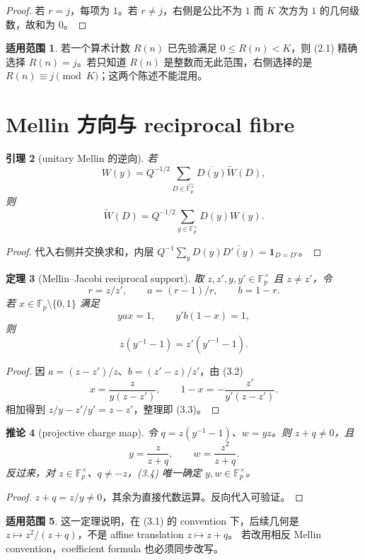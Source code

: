 \documentclass[11pt,a4paper]{ctexart}
\newtheorem{theorem}{定理}[section]
\newtheorem{lemma}[theorem]{引理}
\newtheorem{corollary}[theorem]{推论}
\theoremstyle{definition}
\newtheorem{remark}[theorem]{适用范围}
\newcommand{\F}{\mathbb F}
\newcommand{\G}{\F_p^\times}
\newcommand{\Gh}{\widehat{\G}}
\newcommand{\1}{\mathbf 1}
\begin{document}
\begin{proof}
若 $r=j$，每项为 $1$。若 $r\ne j$，右侧是公比不为 $1$ 而 $K$ 次方为
$1$ 的几何级数，故和为 $0$。
\end{proof}

\begin{remark}
若一个算术计数 $R(n)$ 已先验满足 $0\le R(n)<K$，则 (2.1) 精确选择
$R(n)=j$。若只知道 $R(n)$ 是整数而无此范围，右侧选择的是
$R(n)\equiv j\pmod K$；这两个陈述不能混用。
\end{remark}

\section{Mellin 方向与 reciprocal fibre}

\begin{lemma}[unitary Mellin 的逆向]
若
\[
W(y)=Q^{-1/2}\sum_{D\in\Gh}\overline{D(y)}\widetilde W(D),
\]
则
\[
\boxed{\widetilde W(D)=Q^{-1/2}\sum_{y\in\G}D(y)W(y).}
\tag{3.1}
\]
\end{lemma}

\begin{proof}
代入右侧并交换求和，内层
$Q^{-1}\sum_y D(y)\overline{D'(y)}=\1_{D=D'}$。
\end{proof}

\begin{theorem}[Mellin--Jacobi reciprocal support]
取 $z,z',y,y'\in\G$ 且 $z\ne z'$，令
\[
r=z/z',\qquad a=(r-1)/r,\qquad b=1-r.
\]
若 $x\in\F_p\setminus\{0,1\}$ 满足
\[
yax=1,\qquad y'b(1-x)=1,
\tag{3.2}
\]
则
\[
\boxed{z(y^{-1}-1)=z'(y'^{-1}-1).}
\tag{3.3}
\]
\end{theorem}

\begin{proof}
因 $a=(z-z')/z$、$b=(z'-z)/z'$，由 (3.2)
\[
x=\frac{z}{y(z-z')},\qquad
1-x=-\frac{z'}{y'(z-z')}.
\]
相加得到 $z/y-z'/y'=z-z'$，整理即 (3.3)。
\end{proof}

\begin{corollary}[projective charge map]
令 $q=z(y^{-1}-1)$、$w=yz$。则 $z+q\ne0$，且
\[
\boxed{y=\frac{z}{z+q},\qquad
w=\frac{z^2}{z+q}.}
\tag{3.4}
\]
反过来，对 $z\in\G$、$q\ne-z$，(3.4) 唯一确定 $y,w\in\G$。
\end{corollary}

\begin{proof}
$z+q=z/y\ne0$，其余为直接代数运算。反向代入可验证。
\end{proof}

\begin{remark}
这一定理说明，在 (3.1) 的 convention 下，后续几何是
$z\mapsto z^2/(z+q)$，不是 affine translation $z\mapsto z+q$。
若改用相反 Mellin convention，coefficient formula 也必须同步改写。
\end{remark}
\end{document}
